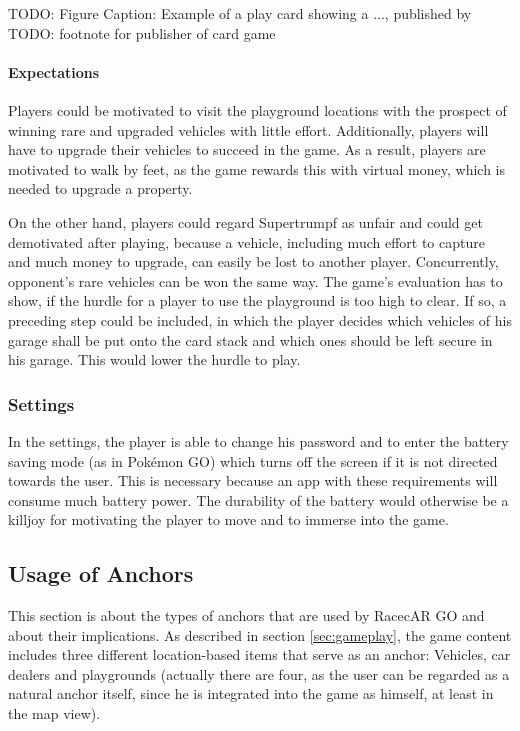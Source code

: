 TODO: Figure
Caption: Example of a play card showing a ..., published by TODO: footnote for publisher of card game

\paragraph{Expectations}
Players could be motivated to visit the playground locations with the prospect of winning rare and upgraded vehicles with little effort. Additionally, players will have to upgrade their vehicles to succeed in the game. As a result, players are motivated to walk by feet, as the game rewards this with virtual money, which is needed to upgrade a property.

On the other hand, players could regard Supertrumpf as unfair and could get demotivated after playing, because a vehicle, including much effort to capture and much money to upgrade, can easily be lost to another player. Concurrently, opponent's rare vehicles can be won the same way. The game's evaluation has to show, if the hurdle for a player to use the playground is too high to clear. If so, a preceding step could be included, in which the player decides which vehicles of his garage shall be put onto the card stack and which ones should be left secure in his garage. This would lower the hurdle to play.

\subsubsection{Settings}
In the settings, the player is able to change his password and to enter the battery saving mode (as in Pok\'{e}mon GO) which turns off the screen if it is not directed towards the user. This is necessary because an app with these requirements will consume much battery power. The durability of the battery would otherwise be a killjoy for motivating the player to move and to immerse into the game.

\subsection{Usage of Anchors}\label{sec:usageOfAnchors}
This section is about the types of anchors that are used by RacecAR GO and about their implications. As described in section \ref{sec:gameplay}, the game content includes three different location-based items that serve as an anchor: Vehicles, car dealers and playgrounds (actually there are four, as the user can be regarded as a natural anchor itself, since he is integrated into the game as himself, at least in the map view).

